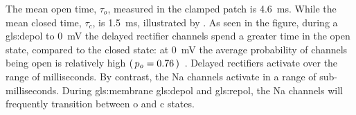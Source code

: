 \documentclass[class={myRUCProject}, crop=false]{standalone}
\begin{document}

The mean open time, \(\tau_o\), measured in the clamped patch is \qty{4.6}{\ms}. While the mean closed time, \(\tau_c\), is \qty{1.5}{\ms}, illustrated by . As seen in the figure, during a \gls{gls:depol} to \qty{0}{\mV} the delayed rectifier channels spend a greater time in the open state, compared to the closed state: at \qty{0}{\mV} the average probability of channels being open is relatively high \(\left(\,p_o = 0.76\,\right)\)~\cite{Hammond2015ch4}.
Delayed rectifiers activate over the range of milliseconds. By contrast, the \gls{Na} channels activate in a range of sub-milliseconds. 
During \gls{gls:membrane} \gls{gls:depol} and \gls{gls:repol}, the \gls{Na} channels will frequently transition between \gls{o} and \gls{c} states. 
\end{document}

